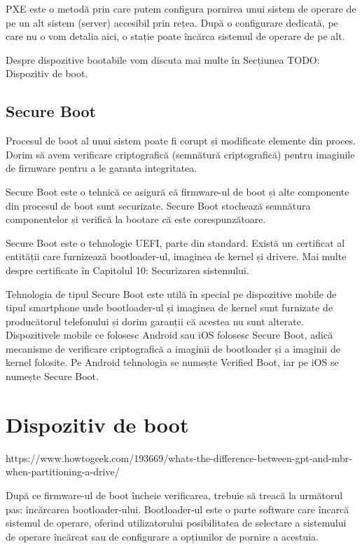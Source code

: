 PXE este o metodă prin care putem configura pornirea unui sistem de operare de
pe un alt sistem (server) accesibil prin rețea. După o configurare dedicată, pe
care nu o vom detalia aici, o stație poate încărca sistemul de operare de pe
alt.

Despre dispozitive bootabile vom discuta mai multe în Secțiunea TODO: Dispozitiv
de boot.

\subsection{Secure Boot}
\label{sec:boot-firmware-secureboot}

Procesul de boot al unui sistem poate fi corupt și modificate elemente din
proces. Dorim să avem verificare criptografică (semnătură criptografică) pentru
imaginile de firmware pentru a le garanta integritatea.

Secure Boot este o tehnică ce asigură că firmware-ul de boot și alte componente
din procesul de boot sunt securizate. Secure Boot stochează semnătura
componentelor și verifică la bootare că este corespunzătoare.

Secure Boot este o tehnologie UEFI, parte din standard. Există un certificat al
entității care furnizează bootloader-ul, imaginea de kernel și drivere. Mai
multe despre certificate în Capitolul 10: Securizarea sistemului.

Tehnologia de tipul Secure Boot este utilă în special pe dispozitive mobile de
tipul smartphone unde bootloader-ul și imaginea de kernel sunt furnizate de
producătorul telefonului și dorim garanții că acestea nu sunt alterate.
Dispozitivele mobile ce folosesc Android sau iOS folosesc Secure Boot, adică
mecanisme de verificare criptografică a imaginii de bootloader și a imaginii de
kernel folosite. Pe Android tehnologia se numește  Verified Boot, iar pe iOS se
numește Secure Boot.

\section{Dispozitiv de boot}
\label{sec:boot-bootdev}

https://www.howtogeek.com/193669/whats-the-difference-between-gpt-and-mbr-when-partitioning-a-drive/

După ce firmware-ul de boot încheie verificarea, trebuie să treacă la următorul
pas: încărcarea bootloader-ului. Bootloader-ul este o parte software care
încarcă sistemul de operare, oferind utilizatorului posibilitatea de selectare a
sistemului de operare încărcat sau de configurare a opțiunilor de pornire a
acestuia.


